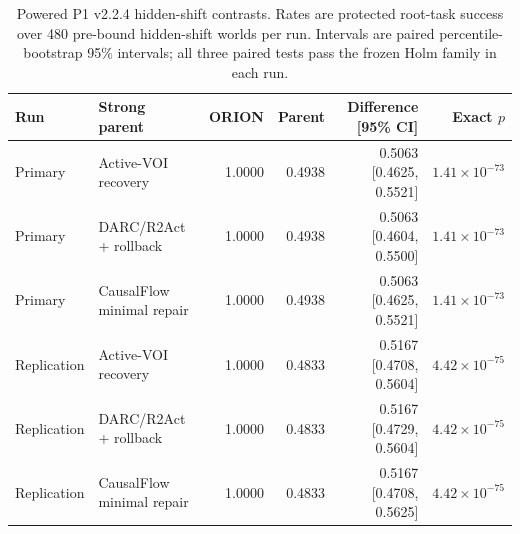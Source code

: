 \begin{table}[htbp]
\centering
\small
\caption{Powered P1 v2.2.4 hidden-shift contrasts. Rates are protected root-task success over 480 pre-bound hidden-shift worlds per run. Intervals are paired percentile-bootstrap 95\% intervals; all three paired tests pass the frozen Holm family in each run.}
\label{tab:P1-T4}
\begin{tabular}{llrrrr}
\toprule
Run & Strong parent & ORION & Parent & Difference [95\% CI] & Exact $p$ \\
\midrule
Primary & Active-VOI recovery & 1.0000 & 0.4938 & 0.5063 [0.4625, 0.5521] & $1.41\times10^{-73}$ \\
Primary & DARC/R2Act + rollback & 1.0000 & 0.4938 & 0.5063 [0.4604, 0.5500] & $1.41\times10^{-73}$ \\
Primary & CausalFlow minimal repair & 1.0000 & 0.4938 & 0.5063 [0.4625, 0.5521] & $1.41\times10^{-73}$ \\
\midrule
Replication & Active-VOI recovery & 1.0000 & 0.4833 & 0.5167 [0.4708, 0.5604] & $4.42\times10^{-75}$ \\
Replication & DARC/R2Act + rollback & 1.0000 & 0.4833 & 0.5167 [0.4729, 0.5604] & $4.42\times10^{-75}$ \\
Replication & CausalFlow minimal repair & 1.0000 & 0.4833 & 0.5167 [0.4708, 0.5625] & $4.42\times10^{-75}$ \\
\bottomrule
\end{tabular}
\end{table}
